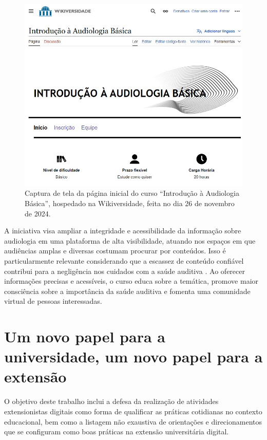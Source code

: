 \documentclass[portuguese]{textolivre}
\begin{document}
\begin{figure}[htbp]
\centering
\begin{minipage}{.75\textwidth}
 \includegraphics[width=\textwidth]{figure04.jpg}
 \caption{Captura de tela da página inicial do curso ``Introdução à Audiologia Básica'', hospedado na Wikiversidade, feita no
dia 26 de novembro de 2024.}
 \label{fig04}
\end{minipage}
\end{figure}


A iniciativa visa ampliar a integridade e acessibilidade da informação
sobre audiologia em uma plataforma de alta visibilidade, atuando nos
espaços em que audiências amplas e diversas costumam procurar por
conteúdos. Isso é particularmente relevante considerando que a escassez
de conteúdo confiável contribui para a negligência nos cuidados com a
saúde auditiva \cite{Morata2024}. Ao oferecer informações precisas e
acessíveis, o curso educa sobre a temática, promove maior consciência
sobre a importância da saúde auditiva e fomenta uma comunidade virtual
de pessoas interessadas.



\section{Um novo papel para a universidade, um novo papel para a
extensão}

O objetivo deste trabalho inclui a defesa da realização de atividades
extensionistas digitais como forma de qualificar as práticas cotidianas
no contexto educacional, bem como a listagem não exaustiva de
orientações e direcionamentos que se configuram como boas práticas na
extensão universitária digital.
\end{document}
